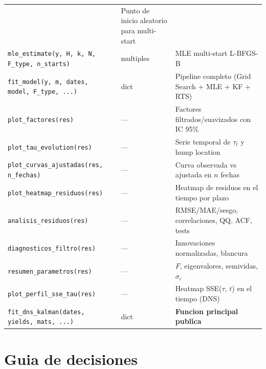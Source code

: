 \documentclass[12pt, a4paper]{article}
\theoremstyle{plain}
\theoremstyle{definition}
\theoremstyle{remark}
\begin{document}
\begin{table}[H]
\begin{tabular}{L{5.0cm} L{2.8cm} L{6.2cm}}
  & Punto de inicio aleatorio para multi-start \\
\texttt{mle\_estimate(y, H, k, N, F\_type, n\_starts)}
  & multiples
  & MLE multi-start L-BFGS-B \\
\texttt{fit\_model(y, m, dates, model, F\_type, ...)}
  & dict
  & Pipeline completo (Grid Search + MLE + KF + RTS) \\
\texttt{plot\_factores(res)}
  & ---
  & Factores filtrados/suavizados con IC 95\% \\
\texttt{plot\_tau\_evolution(res)}
  & ---
  & Serie temporal de $\tau_t$ y hump location \\
\texttt{plot\_curvas\_ajustadas(res, n\_fechas)}
  & ---
  & Curva observada vs ajustada en $n$ fechas \\
\texttt{plot\_heatmap\_residuos(res)}
  & ---
  & Heatmap de residuos en el tiempo por plazo \\
\texttt{analisis\_residuos(res)}
  & ---
  & RMSE/MAE/sesgo, correlaciones, QQ, ACF, tests \\
\texttt{diagnosticos\_filtro(res)}
  & ---
  & Innovaciones normalizadas, blancura \\
\texttt{resumen\_parametros(res)}
  & ---
  & $F$, eigenvalores, semividas, $\sigma_\varepsilon$ \\
\texttt{plot\_perfil\_sse\_tau(res)}
  & ---
  & Heatmap SSE($\tau$, $t$) en el tiempo (DNS) \\
\texttt{fit\_dns\_kalman(dates, yields, mats, ...)}
  & dict
  & \textbf{Funcion principal publica} \\
\bottomrule
\end{tabular}
\end{table}

\section{Guia de decisiones}
\label{sec:guia}
\end{document}
